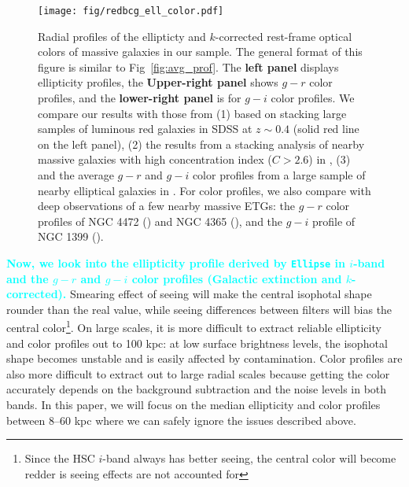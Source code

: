\documentclass[a4paper,fleqn,usenatbib]{mnras}
\newcommand{\song}[1]{\textcolor{cyan}{\textbf{#1}}}
\begin{document}
  \begin{figure}
      \centering 
      \texttt{[image: fig/redbcg\_ell\_color.pdf]}
      \caption{
          Radial profiles of the ellipticty and $k$-corrected rest-frame optical colors 
          of massive galaxies in our sample. 
          The general format of this figure is similar to Fig~\ref{fig:avg_prof}.  
          The \textbf{left panel} displays ellipticity profiles, 
          the \textbf{Upper-right panel} shows $g-r$ color profiles, and  the
          \textbf{lower-right panel} is for $g-i$ color profiles. 
          We compare our results with those from (1) \citet{Tal2011} based on stacking 
          large samples of luminous red galaxies in SDSS at $z{\sim} 0.4$ 
          (solid red line on the left panel), 
          (2) the results from a stacking analysis of nearby massive 
          galaxies with high concentration index ($C>2.6$) in 
          \citet[][blue dash lines on the left and upper-right panels]{DSouza2014}, 
          (3) and the average $g-r$ and $g-i$ color profiles 
          from a large sample of nearby elliptical galaxies in \citet[][blue, solid 
          lines on both right panels]{LaBarbera2010}.
          For color profiles, we also compare with deep observations of a few nearby 
          massive ETGs: the $g-r$ color profiles of NGC 4472 (\citealt{Mihos2013}) 
          and NGC 4365 (\citealt{Mihos2017}), and the $g-i$ profile of NGC 1399 
          (\citealt{Iodice2016}).
          }
      \label{fig:ell_color}
  \end{figure}
    
    
    \song{
    Now, we look into the ellipticity profile derived by \texttt{Ellipse} in $i$-band 
    and the $g-r$ and $g-i$ color profiles (Galactic extinction and $k$-corrected). 
    }
	Smearing effect of seeing will make the central isophotal shape rounder than the 
	real value, while seeing differences between filters will bias the central 
	color\footnote{Since the HSC $i$-band always has better seeing, the central color 
	will become redder is seeing effects are not accounted for}. 
	On large scales, it is more difficult to extract reliable ellipticity and 
	color profiles out to 100 kpc: at low surface brightness levels, the isophotal 
	shape becomes unstable and is easily affected by contamination. 
	Color profiles are also more difficult to extract out to large radial scales
	because getting the color accurately depends on the background subtraction and 
	the noise levels in both bands. 
	In this paper, we will focus on the median ellipticity and color profiles between 
	8--60 kpc where we can safely ignore the issues described above. 
	 
\end{document}
